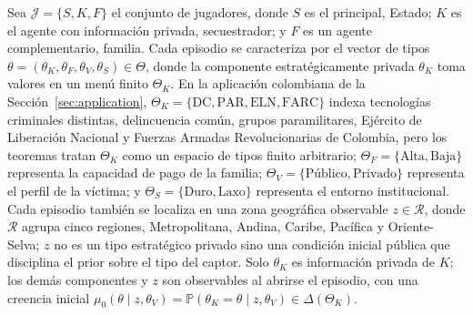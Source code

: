\documentclass[review,authoryear,12pt]{elsarticle}
\theoremstyle{plain}
\theoremstyle{definition}
\newcommand{\Prob}{\mathbb{P}}
\newcommand{\ThetaK}{\Theta_K}
\newcommand{\1}{\mathbf{1}}
\begin{document}
Sea $\mathcal{J}=\{S,K,F\}$ el conjunto de jugadores, donde $S$ es el principal, Estado; $K$ es el agente con información privada, secuestrador; y $F$ es un agente complementario, familia. Cada episodio se caracteriza por el vector de tipos $\theta=(\theta_K,\theta_F,\theta_V,\theta_S)\in\Theta$, donde la componente estratégicamente privada $\theta_K$ toma valores en un menú finito $\ThetaK$. En la aplicación colombiana de la Sección~\ref{sec:application}, $\ThetaK=\{\text{DC},\text{PAR},\text{ELN},\text{FARC}\}$ indexa tecnologías criminales distintas, delincuencia común, grupos paramilitares, Ejército de Liberación Nacional y Fuerzas Armadas Revolucionarias de Colombia, pero los teoremas tratan $\ThetaK$ como un espacio de tipos finito arbitrario; $\Theta_F=\{\text{Alta},\text{Baja}\}$ representa la capacidad de pago de la familia; $\Theta_V=\{\text{Público},\text{Privado}\}$ representa el perfil de la víctima; y $\Theta_S=\{\text{Duro},\text{Laxo}\}$ representa el entorno institucional. Cada episodio también se localiza en una zona geográfica observable $z\in\mathcal{R}$, donde $\mathcal{R}$ agrupa cinco regiones, Metropolitana, Andina, Caribe, Pacífica y Oriente-Selva; $z$ no es un tipo estratégico privado sino una condición inicial pública que disciplina el prior sobre el tipo del captor. Solo $\theta_K$ es información privada de $K$; los demás componentes y $z$ son observables al abrirse el episodio, con una creencia inicial $\mu_0(\theta\mid z,\theta_V)=\Prob(\theta_K=\theta\mid z,\theta_V)\in\Delta(\ThetaK)$.
\end{document}
